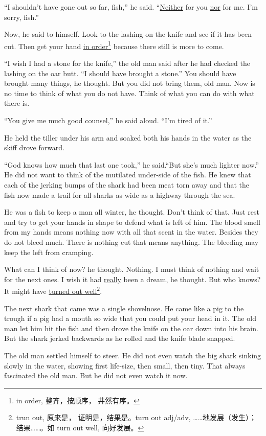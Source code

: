 ``I shouldn't have gone out so far, fish,'' he said. ``\uline{Neither} for
you \uline{nor} for me. I'm sorry, fish.''

Now, he said to himself. Look to the lashing on the knife and see if it has
been cut. Then get your hand \uline{in order}\footnote{in order, 整齐，按顺序，
  井然有序。} because there still is more to come.

``I wish I had a stone for the knife,'' the old man said after he had
checked the lashing on the oar butt. ``I should have brought a stone.'' You
should have brought many things, he thought. But you did not bring them, old
man. Now is no time to think of what you do not have. Think of what you can
do with what there is.

``You give me much good \gls{counsel},'' he said aloud. ``I'm tired of it.''

He held the tiller under his arm and soaked both his hands in the water as
the skiff drove forward.

``God knows how much that last one took,'' he said.``But she's much lighter
now.'' He did not want to think of the mutilated under-side of the fish. He
knew that each of the jerking \glspl{bump} of the shark had been meat
\gls{torn} away and that the fish now made a trail for all sharks as wide as
a \gls{highway} through the sea.

He was a fish to keep a man all winter, he thought. Don't think of that.
Just rest and try to get your hands in shape to defend what is left of him.
The blood smell from my hands means nothing now with all that scent in the
water. Besides they do not bleed much. There is nothing cut that means
anything. The bleeding may keep the left from cramping.

What can I think of now? he thought. Nothing. I must think of nothing and
wait for the next ones. I wish it had \uline{really} been a dream, he thought.
But who knows? It might have \uline{turned out well}\footnote{trun out, 原来是，
  证明是，结果是。turn out adj/adv, ……地发展（发生）；结果……。如 turn
  out well, 向好发展。}.

The next shark that came was a single shovelnose. He came like a pig to the
trough if a pig had a mouth so wide that you could put your head in it. The
old man let him hit the fish and then drove the knife on the oar down into
his brain. But the shark jerked backwards as he rolled and the knife blade
snapped.

The old man settled himself to steer. He did not even watch the big shark
sinking slowly in the water, showing first \gls{life-size}, then small, then
tiny. That always \gls{fascinated} the old man. But he did not even watch it now.

